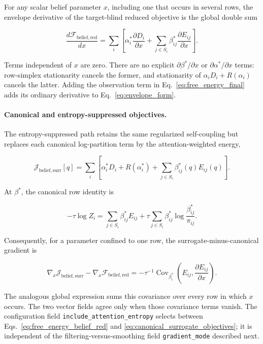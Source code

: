 \documentclass[twoside,11pt]{article}
\begin{document}
For any scalar belief parameter $x$, including one that occurs in several rows, the envelope derivative of the target-blind reduced objective is the global double sum

\begin{equation}
\frac{d\mathcal{F}_{\mathrm{belief,red}}}{dx}
=\sum_i\left[
\alpha_i^*\frac{\partial D_i}{\partial x}
+\sum_{j\in S_i}\beta_{ij}^*\frac{\partial E_{ij}}{\partial x}
\right].
\label{eq:envelope_form}
\end{equation}

Terms independent of $x$ are zero. There are no explicit $\partial\beta^*/\partial x$ or $\partial\alpha^*/\partial x$ terms: row-simplex stationarity cancels the former, and stationarity of $\alpha_iD_i+R(\alpha_i)$ cancels the latter. Adding the observation term in Eq.~\eqref{eq:free_energy_final} adds its ordinary derivative to Eq.~\eqref{eq:envelope_form}.

\paragraph{Canonical and entropy-suppressed objectives.} The entropy-suppressed path retains the same regularized self-coupling but replaces each canonical log-partition term by the attention-weighted energy,

\begin{equation}
\mathcal{J}_{\mathrm{belief,surr}}[q]
=\sum_i\left[
\alpha_i^*D_i+R(\alpha_i^*)
+\sum_{j\in S_i}\beta_{ij}^*(q)E_{ij}(q)
\right].
\label{eq:canonical_surrogate_objectives}
\end{equation}

At $\beta^*$, the canonical row identity is

\begin{equation}
-\tau\log Z_i
=\sum_{j\in S_i}\beta_{ij}^*E_{ij}
+\tau\sum_{j\in S_i}\beta_{ij}^*\log\frac{\beta_{ij}^*}{\pi_{ij}}.
\label{eq:canonical_row_decomposition}
\end{equation}

Consequently, for a parameter confined to one row, the surrogate-minus-canonical gradient is

\begin{equation}
\nabla_x\mathcal{J}_{\mathrm{belief,surr}}
-\nabla_x\mathcal{F}_{\mathrm{belief,red}}
=-\tau^{-1}\operatorname{Cov}_{\beta_i^*}
\left(E_{ij},\frac{\partial E_{ij}}{\partial x}\right).
\label{eq:autograd_envelope_gap}
\end{equation}

The analogous global expression sums this covariance over every row in which $x$ occurs. The two vector fields agree only when those covariance terms vanish. The configuration field \texttt{include\_attention\_entropy} selects between Eqs.~\eqref{eq:free_energy_belief_red} and \eqref{eq:canonical_surrogate_objectives}; it is independent of the filtering-versus-smoothing field \texttt{gradient\_mode} described next.
\end{document}
